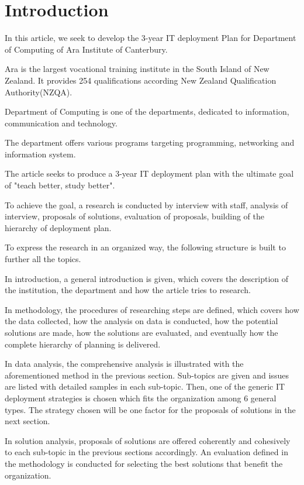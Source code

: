 
\section{Introduction}

In this article, we seek to develop the 3-year IT deployment Plan for Department of Computing of Ara Institute of Canterbury.

Ara is the largest vocational training institute in the South Island of New Zealand. It provides 254 qualifications according New Zealand Qualification Authority(NZQA).

Department of Computing is one of the departments, dedicated to information, communication and technology.

The department offers various programs targeting programming, networking and information system.

The article seeks to produce a 3-year IT deployment plan with the ultimate goal of "teach better, study better".

To achieve the goal, a research is conducted by interview with staff, analysis of interview, proposals of solutions, evaluation of proposals, building of the hierarchy of deployment plan.

To express the research in an organized way, the following structure is built to further all the topics.

In introduction, a general introduction is given, which covers the description of the institution, the department and how the article tries to research.

In methodology, the procedures of researching steps are defined, which covers how the data collected, how the analysis on data is conducted, how the potential solutions are made, how the solutions are evaluated, and eventually how the complete hierarchy of planning is delivered.

In data analysis, the comprehensive analysis is illustrated with the aforementioned method in the previous section. Sub-topics are given and issues are listed with detailed samples in each sub-topic. Then, one of the generic IT deployment strategies is chosen which fits the organization among 6 general types. The strategy chosen will be one factor for the proposals of solutions in the next section.

In solution analysis, proposals of solutions are offered coherently and cohesively to each sub-topic in the previous sections accordingly. An evaluation defined in the methodology is conducted for selecting the best solutions that benefit the organization.

